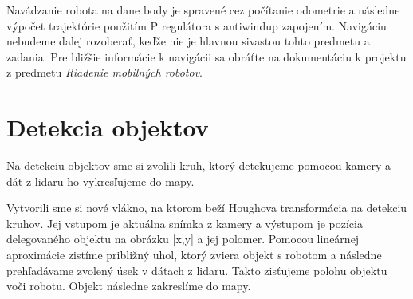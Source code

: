 Navádzanie robota na dane body je spravené cez počítanie odometrie a následne výpočet trajektórie
použitím P regulátora s antiwindup zapojením. Navigáciu nebudeme ďalej rozoberať, keďže nie je hlavnou sivastou
tohto predmetu a zadania. Pre bližšie informácie k navigácii sa obráťte na dokumentáciu k projektu
z predmetu \textit{Riadenie mobilných robotov}.


\section{Detekcia objektov}
Na detekciu objektov sme si zvolili kruh, ktorý detekujeme pomocou kamery a dát z lidaru ho vykresľujeme do mapy. 

Vytvorili sme si nové vlákno, na ktorom beží Houghova transformácia na detekciu kruhov. Jej vstupom je aktuálna snímka z kamery a výstupom je pozícia delegovaného objektu na obrázku [x,y] a jej polomer. Pomocou lineárnej aproximácie zistíme približný uhol, ktorý zviera objekt s robotom a následne prehľadávame zvolený úsek v dátach z lidaru. Takto zisťujeme polohu objektu voči robotu. Objekt následne zakreslíme do mapy.

